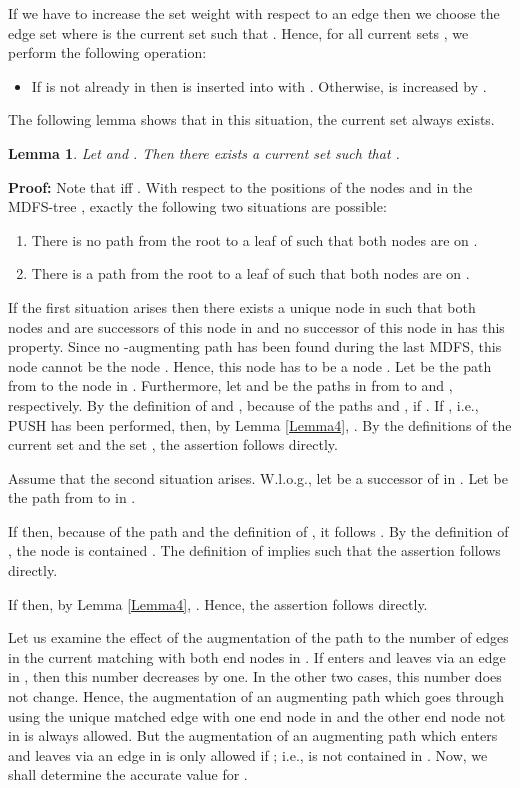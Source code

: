 \documentclass[12pt,twoside,a4paper]{article}
\def\QED{\hbox{\hskip 1pt \vrule width4pt height 6pt depth 1.5pt \hskip 1pt}}
\newtheorem{lemma}{Lemma}
\begin{document}
If we have to increase the set weight with respect to an edge  
then we choose the edge set  where  is the current set such that 
. Hence, for all current sets , we perform the following
operation:
\begin{itemize}
\item
If  is not already in  then  is inserted into  with 
. Otherwise,  is increased by . 
\end{itemize}
The following lemma shows that in this situation, the current set  always exists.
\begin{lemma} \label{pd1}
Let  and . Then there exists 
a current set  such that .
\end{lemma} 
{\bf Proof:} 
Note that  iff .
With respect to the positions of the nodes  and  in the MDFS-tree , exactly
the following two situations are possible: 
\begin{enumerate}
\item
There is no path  from the root  to a leaf of  such that both
nodes are on .
\item
There is a path  from the root  to a leaf of  such that both
nodes are on .
\end{enumerate}
If the first situation arises then there exists a unique node in  such that both nodes 
 and  are successors of this node in  and no successor of this node in  
has this property. Since no -augmenting path has been found during the last MDFS, this 
node cannot be the node . Hence, this node has to be a node .
Let  be the path from  to the node  in . Furthermore,
let  and  be the paths in  from  to  and 
, respectively. 
By the definition of  and ,
because of the paths  and
,  if . 
If , i.e., PUSH has been performed, then, by Lemma \ref{Lemma4},
. By the definitions of the current set  and
the set , the assertion follows directly.

Assume that the second situation arises. W.l.o.g., let  be a successor of  
in . Let  be the path from  to  in . 

If  then, because of the path  and
the definition of , it follows . By the definition
of , the node  is contained . The definition of  implies 
 such that the assertion follows directly.

If  then, by Lemma \ref{Lemma4}, . Hence, the assertion 
follows directly.
\QED

\medskip
Let us examine the effect of the augmentation of the path  to the number of edges
in the current matching with both end nodes in .
If  enters and leaves  via an edge in , then this number  
decreases by one. In the other two cases, this number does not change.
Hence, the augmentation of an augmenting path which goes through 
using the unique matched edge with one end node in  and the other end node 
not in  is always allowed. But the augmentation of an augmenting path which
enters and leaves  via an edge in 
is only allowed if ; i.e.,  is not contained in .
Now, we shall determine the accurate value for .
\end{document}
